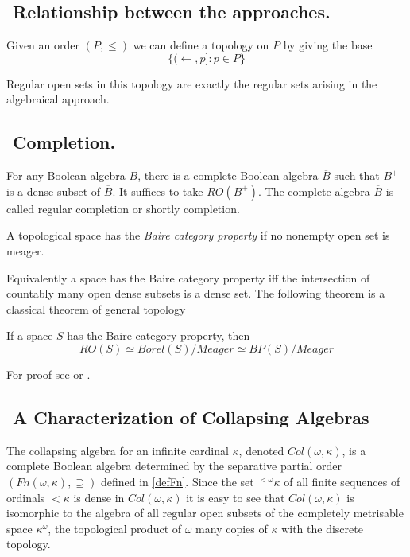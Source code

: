 \subsection{${}$ \hspace{-1em}Relationship between the approaches.}

Given an order $(P,\leq)$ we can define a topology on $P$ by giving the base
$$ %
\{(\leftarrow,p]:p\in P\}
$$ %

Regular open sets in this topology are exactly the regular sets arising in the algebraical approach.

\subsection{${}$ \hspace{-1em}Completion.}
For any Boolean algebra $B$, there is a complete Boolean algebra $\overline{B}$ such that $B^+$ is a dense subset of $\overline{B}$. It suffices
to take $RO(B^+)$. The complete algebra $\overline{B}$ is called regular completion
or shortly completion.

\begin{definition} A topological space has the \emph{Baire category property} if no nonempty open set is meager.
\end{definition}

Equivalently a space has the Baire category property iff the intersection of countably many open dense subsets
is a dense set. The following theorem is a classical theorem of general topology

\begin{theorem} If a space $S$ has the Baire category property, then
 $$
 RO(S)\simeq Borel(S)/Meager\simeq BP(S)/Meager
 $$
\end{theorem}
For proof see \cite{BSHBA} or \cite{Engelking}.

\subsection{${}$ \hspace{-1em}A Characterization of Collapsing Algebras}
The collapsing algebra for an infinite cardinal $\kappa$, denoted $Col(\omega,\kappa)$, is a complete
Boolean algebra determined by the separative partial order $(Fn(\omega,\kappa),\supseteq)$ defined in
\ref{defFn}. Since the set ${}^{<\omega}\kappa$ of all finite sequences of ordinals $<\kappa$ is dense in
$Col(\omega,\kappa)$ it is easy to see that $Col(\omega,\kappa)$ is isomorphic to the algebra of all regular open
subsets of the completely metrisable space $\kappa^\omega$, the topological product of $\omega$ many copies of $\kappa$
with the discrete topology.


